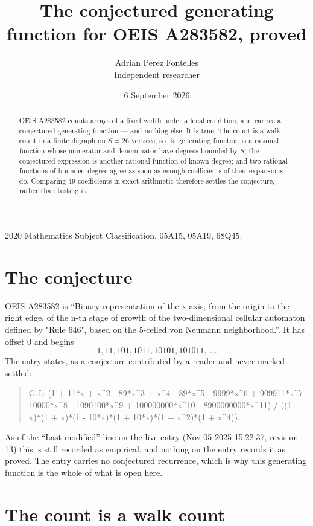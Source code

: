 \documentclass[11pt,a4paper]{article}
\title{The conjectured generating function for OEIS A283582, proved}
\author{Adrian Perez Fontelles\\ \small Independent researcher}
\date{6 September 2026}
\theoremstyle{plain}
\theoremstyle{definition}
\begin{document}
\maketitle

\begin{abstract}
OEIS A283582 counts arrays of a fixed width under a local condition, and carries a conjectured
generating function --- and nothing else. It is true. The count is a walk count in a finite
digraph on $S=26$ vertices, so its generating function is a rational function whose numerator
and denominator have degrees bounded by $S$; the conjectured expression is another rational
function of known degree; and two rational functions of bounded degree agree as soon as enough
coefficients of their expansions do. Comparing $49$ coefficients in exact arithmetic
therefore settles the conjecture, rather than testing it.
\end{abstract}

\noindent\small 2020 Mathematics Subject Classification. 05A15, 05A19, 68Q45.\normalsize

\section{The conjecture}

OEIS A283582 is ``Binary representation of the x-axis, from the origin to the right edge, of the n-th stage of growth of the two-dimensional cellular automaton defined by "Rule 646", based on the 5-celled von Neumann neighborhood.''. It has offset $0$ and begins
\[
1, 11, 101, 1011, 10101, 101011,\ \dots
\]
The entry states, as a conjecture contributed by a reader and never marked settled:
\begin{quote}
G.f.: (1 + 11*x + x\^{}2 - 89*x\^{}3 + x\^{}4 - 89*x\^{}5 - 9999*x\^{}6 + 909911*x\^{}7 - 10000*x\^{}8 - 1090100*x\^{}9 + 100000000*x\^{}10 - 8900000000*x\^{}11) / ((1 - x)*(1 + x)*(1 - 10*x)*(1 + 10*x)*(1 + x\^{}2)*(1 + x\^{}4)).
\end{quote}
As of the ``Last modified'' line on the live entry (Nov 05 2025 15:22:37, revision 13) this is still
recorded as empirical, and nothing on the entry records it as proved. The entry carries no
conjectured recurrence, which is why this generating function is the whole of what is open
here.

\section{The count is a walk count}
\end{document}
